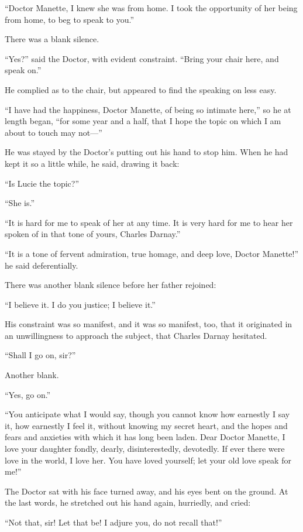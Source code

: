 ``Doctor Manette, I knew she was from home.  I took the opportunity of
her being from home, to beg to speak to you.''

There was a blank silence.

``Yes?'' said the Doctor, with evident constraint.  ``Bring your chair here,
and speak on.''

He complied as to the chair, but appeared to find the speaking on
less easy.

``I have had the happiness, Doctor Manette, of being so intimate
here,'' so he at length began, ``for some year and a half, that I hope
the topic on which I am about to touch may not---''

He was stayed by the Doctor's putting out his hand to stop him.
When he had kept it so a little while, he said, drawing it back:

``Is Lucie the topic?''

``She is.''

``It is hard for me to speak of her at any time.  It is very hard for
me to hear her spoken of in that tone of yours, Charles Darnay.''

``It is a tone of fervent admiration, true homage, and deep love,
Doctor Manette!'' he said deferentially.

There was another blank silence before her father rejoined:

``I believe it.  I do you justice; I believe it.''

His constraint was so manifest, and it was so manifest, too, that it
originated in an unwillingness to approach the subject, that Charles
Darnay hesitated.

``Shall I go on, sir?''

Another blank.

``Yes, go on.''

``You anticipate what I would say, though you cannot know how earnestly
I say it, how earnestly I feel it, without knowing my secret heart,
and the hopes and fears and anxieties with which it has long been
laden.  Dear Doctor Manette, I love your daughter fondly, dearly,
disinterestedly, devotedly.  If ever there were love in the world,
I love her.  You have loved yourself; let your old love speak for me!''

The Doctor sat with his face turned away, and his eyes bent on the
ground.  At the last words, he stretched out his hand again, hurriedly,
and cried:

``Not that, sir!  Let that be!  I adjure you, do not recall that!''

